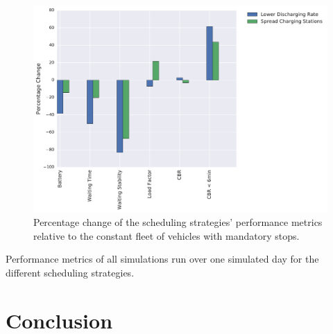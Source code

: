 \documentclass[12pt,a4paper]{article}
\begin{document}
\begin{figure}
  \centering
\includegraphics[scale=0.55]{./images/batteryCompare.pdf}
  \caption{Percentage change of the scheduling strategies' performance metrics relative to the constant fleet of vehicles with mandatory stops.}
\label{batterycompare}
\end{figure}

\begin{table}
\center
{}
\caption{Performance metrics of all simulations run over one simulated day for the different scheduling strategies.}
\end{table}

\section{Conclusion}\label{conclusion}
\end{document}
